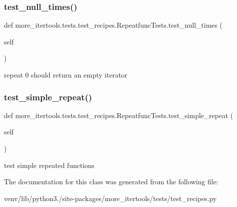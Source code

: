 \subsubsection{\texorpdfstring{test\+\_\+null\+\_\+times()}{test\_null\_times()}}
{\footnotesize\ttfamily def more\+\_\+itertools.\+tests.\+test\+\_\+recipes.\+Repeatfunc\+Tests.\+test\+\_\+null\+\_\+times (\begin{DoxyParamCaption}\item[{}]{self }\end{DoxyParamCaption})}

\begin{DoxyVerb}repeat 0 should return an empty iterator\end{DoxyVerb}
 \mbox{\label{classmore__itertools_1_1tests_1_1test__recipes_1_1_repeatfunc_tests_a1c598505f1cc7aa61cb987f20faed931}} 
\subsubsection{\texorpdfstring{test\+\_\+simple\+\_\+repeat()}{test\_simple\_repeat()}}
{\footnotesize\ttfamily def more\+\_\+itertools.\+tests.\+test\+\_\+recipes.\+Repeatfunc\+Tests.\+test\+\_\+simple\+\_\+repeat (\begin{DoxyParamCaption}\item[{}]{self }\end{DoxyParamCaption})}

\begin{DoxyVerb}test simple repeated functions\end{DoxyVerb}
 

The documentation for this class was generated from the following file\+:\begin{DoxyCompactItemize}
\item 
venv/lib/python3./site-\/packages/more\+\_\+itertools/tests/test\+\_\+recipes.\+py\end{DoxyCompactItemize}
